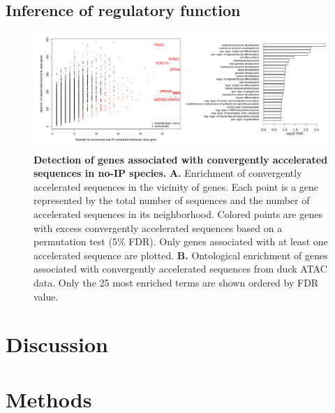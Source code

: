 \subsection{Inference of regulatory function}

\begin{figure}[h]
    \centering
    \includegraphics[width=1\textwidth, page=1] {figures/IPLOSS/Fig_enrich.png}
    \caption[Detection of genes associated with convergently accelerated sequences in no-IP species.]{
    \textbf{Detection of genes associated with convergently accelerated sequences in no-IP species.}
     \textbf{A.}  Enrichment of convergently accelerated sequences in the vicinity of genes. Each point is a gene represented by the total number of sequences and the number of accelerated sequences in its neighborhood. Colored points are genes with excess convergently accelerated sequences based on a permutation test (5\% FDR). Only genes associated with at least one accelerated sequence are plotted. 
     \textbf{B.} Ontological enrichment of genes associated with convergently accelerated sequences from duck ATAC data. Only the 25 most enriched terms are shown ordered by FDR value.
    \\
    }
    \label{fig:IPLOSS-fig5}
\end{figure} 

\section{Discussion}

\section{Methods}